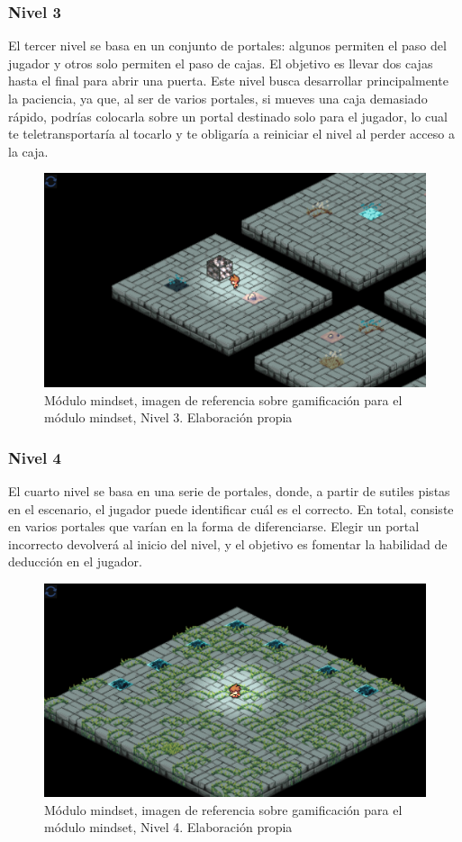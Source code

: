\subsubsection{Nivel 3}
El tercer nivel se basa en un conjunto de portales: algunos permiten el paso del jugador y otros solo permiten el paso de cajas. El objetivo es llevar dos cajas hasta el final para abrir una puerta. Este nivel busca desarrollar principalmente la paciencia, ya que, al ser de varios portales, si mueves una caja demasiado rápido, podrías colocarla sobre un portal destinado solo para el jugador, lo cual te teletransportaría al tocarlo y te obligaría a reiniciar el nivel al perder acceso a la caja.

\begin{figure}[H]
  \centering
  \includegraphics[width=0.7\linewidth]{Imagenes/Nivel3.png}
  \caption{Módulo mindset, imagen de referencia sobre gamificación para el módulo mindset, Nivel 3. Elaboración propia}
  \label{fig:imagen1mindset}
\end{figure}
\subsubsection{Nivel 4}
El cuarto nivel se basa en una serie de portales, donde, a partir de sutiles pistas en el escenario, el jugador puede identificar cuál es el correcto. En total, consiste en varios portales que varían en la forma de diferenciarse. Elegir un portal incorrecto devolverá al inicio del nivel, y el objetivo es fomentar la habilidad de deducción en el jugador.

\begin{figure}[H]
  \centering
  \includegraphics[width=0.7\linewidth]{Imagenes/Nivel4.png}
  \caption{Módulo mindset, imagen de referencia sobre gamificación para el módulo mindset, Nivel 4. Elaboración propia}
  \label{fig:imagen1mindset}
\end{figure}

